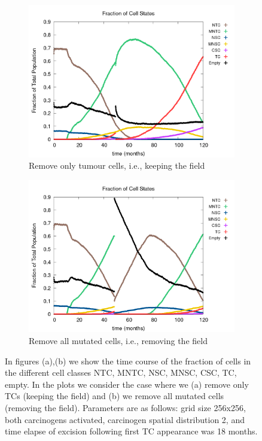 \documentclass[\main/thesis.tex]{subfiles}
\begin{document}
\begin{figure}[H]
    \centering
    \begin{subfigure}[t]{.49\textwidth}
      \centering
      \includegraphics[width=\textwidth]{images/5_TumourExcisions/Fig1/numState_all_Keep.png}
      \caption{Remove only tumour cells, i.e., keeping the field}
      \label{fig:TumourExcision_numState_Keep}
    \end{subfigure}
    \begin{subfigure}[t]{.49\textwidth}
      \centering
      \includegraphics[width=\textwidth]{images/5_TumourExcisions/Fig1/numState_all_Remove.png}
      \caption{Remove all mutated cells, i.e., removing the field}
      \label{fig:TumourExcision_numState_Remove}
    \end{subfigure}
    \caption{In figures (a),(b) we show the time course of the fraction of cells in the different cell classes NTC, MNTC, NSC, MNSC, CSC, TC, empty. In the plots we consider the case where we (a) remove only TCs (keeping the field) and (b) we remove all mutated cells (removing the field). Parameters are as follows: grid size 256x256, both carcinogens activated, carcinogen spatial distribution 2, and time elapse of excision following first TC appearance was 18 months.}
    \label{fig:TumourExcision_numState}
\end{figure}
\end{document}
